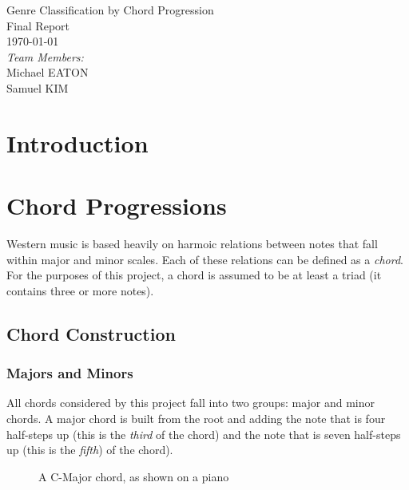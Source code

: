 ﻿\documentclass{article}
\begin{document}
\fancyhf{}
\rhead{\today}

\begin{titlepage}
\begin{center}
{\huge Genre Classification by Chord Progression}\\[2cm]
{\Large Final Report}\\[2cm]
{\large \today}\\[2cm]
\emph{Team Members:}\\
Michael \uppercase{Eaton}\\
Samuel \uppercase{Kim}\\
\end{center}
\end{titlepage}

\tableofcontents
\newpage

\section{Introduction}

\newpage

\section{Chord Progressions}
Western music is based heavily on harmoic relations between notes 
that fall within major and minor scales. Each of these relations can be 
defined as a \emph{chord}.  For the purposes of this project, a chord 
is assumed to be at least a triad (it contains three or more notes).

	\subsection{Chord Construction}
	
		\subsubsection{Majors and Minors}
		All chords considered by this project fall into two groups:  major 
		and minor chords.  A major chord is built from the root and adding 
		the note that is four half-steps up (this is the \emph{third} of the 
		chord) and the note that is seven half-steps up (this is the \emph{fifth}) 
		of the chord).

		\begin{figure}[htb]
		\caption{A  C-Major chord, as shown on a piano}
		\end{figure} 
\end{document}
